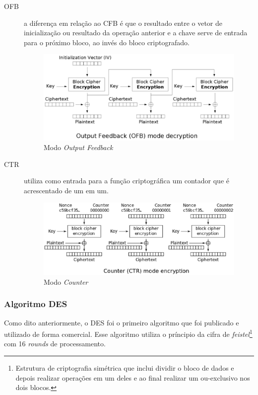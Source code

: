 \begin{description}
\item[OFB] a diferença em relação ao CFB é que o resultado entre o vetor de inicialização ou resultado da operação anterior e a chave serve de entrada para o próximo bloco, ao invés do bloco criptografado.
\begin{figure}[h]
\centering
\includegraphics[keepaspectratio=true,scale=0.7]
    {figuras/ofb.eps}
    \caption[Modo Output Feedback]{Modo \textit{Output Feedback}\protect\footnotemark} 
\end{figure}
\item[CTR] utiliza como entrada para a função criptográfica um contador que é acrescentado de um em um. 
\begin{figure}[h]
\centering
\includegraphics[keepaspectratio=true,scale=0.5]
    {figuras/ctr.eps}
    \caption[Modo Counter]{Modo \textit{Counter}\protect\footnotemark} 
\end{figure}
\end{description}

\subsubsection{Algoritmo DES}

Como dito anteriormente, o DES foi o primeiro algoritmo que foi publicado e utilizado de forma comercial. Esse algoritmo utiliza o príncipio da cifra de \textit{feistel}\footnote{Estrutura de criptografia simétrica que inclui dividir o bloco de dados e depois realizar operações em um deles e ao final realizar um ou-exclusivo nos dois blocos.} com 16 \textit{rounds} de processamento.

